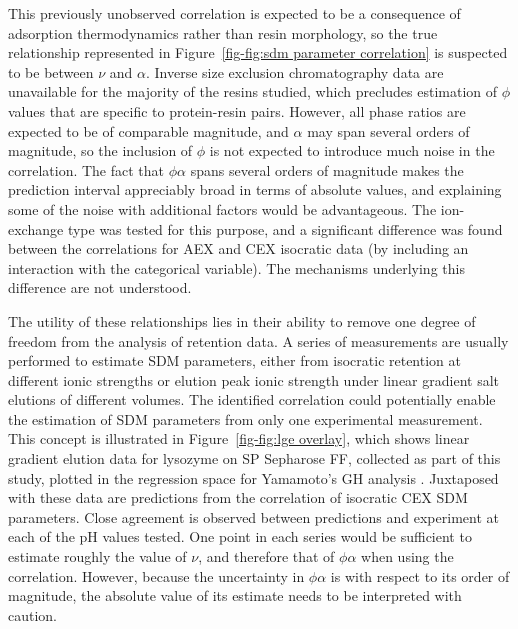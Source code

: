 \documentclass[preprint,review,12pt]{elsarticle}
\begin{document}
        This previously unobserved correlation is expected to be a consequence of adsorption thermodynamics rather than resin morphology, so the true relationship represented in Figure~\ref{fig-fig:sdm parameter correlation} is suspected to be between $\nu$ and $\alpha$. Inverse size exclusion chromatography data are unavailable for the majority of the resins studied, which precludes estimation of $\phi$ values that are specific to protein-resin pairs. However, all phase ratios are expected to be of comparable magnitude, and $\alpha$ may span several orders of magnitude, so the inclusion of $\phi$ is not expected to introduce much noise in the correlation. The fact that $\phi \alpha$ spans several orders of magnitude makes the prediction interval appreciably broad in terms of absolute values, and explaining some of the noise with additional factors would be advantageous. The ion-exchange type was tested for this purpose, and a significant difference was found between the correlations for AEX and CEX isocratic data (by including an interaction with the categorical variable). The mechanisms underlying this difference are not understood.


        The utility of these relationships lies in their ability to remove one degree of freedom from the analysis of retention data. A series of measurements are usually performed to estimate SDM parameters, either from isocratic retention at different ionic strengths or elution peak ionic strength under linear gradient salt elutions of different volumes. The identified correlation could potentially enable the estimation of SDM parameters from only one experimental measurement. This concept is illustrated in Figure~\ref{fig-fig:lge overlay}, which shows linear gradient elution data for lysozyme on SP Sepharose FF, collected as part of this study, plotted in the regression space for Yamamoto's GH analysis \cite{Yamamoto1987}. Juxtaposed with these data are predictions from the correlation of isocratic CEX SDM parameters. Close agreement is observed between predictions and experiment at each of the pH values tested. One point in each series would be sufficient to estimate roughly the value of $\nu$, and therefore that of $\phi \alpha$ when using the correlation. However, because the uncertainty in $\phi \alpha$ is with respect to its order of magnitude, the absolute value of its estimate needs to be interpreted with caution.
\end{document}
